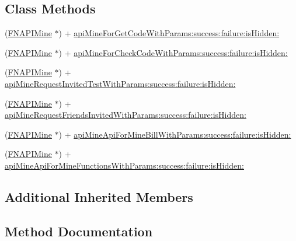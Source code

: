 \subsection*{Class Methods}
\begin{DoxyCompactItemize}
\item 
(\mbox{\hyperlink{interface_f_n_a_p_i_mine}{F\+N\+A\+P\+I\+Mine}} $\ast$) + \mbox{\hyperlink{interface_f_n_a_p_i_mine_a50062a925d7aa11ca5bb236073ecb43d}{api\+Mine\+For\+Get\+Code\+With\+Params\+:success\+:failure\+:is\+Hidden\+:}}
\item 
(\mbox{\hyperlink{interface_f_n_a_p_i_mine}{F\+N\+A\+P\+I\+Mine}} $\ast$) + \mbox{\hyperlink{interface_f_n_a_p_i_mine_ab0f166f0a2c655890d71830f4ab7c825}{api\+Mine\+For\+Check\+Code\+With\+Params\+:success\+:failure\+:is\+Hidden\+:}}
\item 
(\mbox{\hyperlink{interface_f_n_a_p_i_mine}{F\+N\+A\+P\+I\+Mine}} $\ast$) + \mbox{\hyperlink{interface_f_n_a_p_i_mine_a4d4e9cfee5260312ab78d8a65a554c58}{api\+Mine\+Request\+Invited\+Test\+With\+Params\+:success\+:failure\+:is\+Hidden\+:}}
\item 
(\mbox{\hyperlink{interface_f_n_a_p_i_mine}{F\+N\+A\+P\+I\+Mine}} $\ast$) + \mbox{\hyperlink{interface_f_n_a_p_i_mine_a4dd05da3324d96a0df4e13924c51c815}{api\+Mine\+Request\+Friends\+Invited\+With\+Params\+:success\+:failure\+:is\+Hidden\+:}}
\item 
(\mbox{\hyperlink{interface_f_n_a_p_i_mine}{F\+N\+A\+P\+I\+Mine}} $\ast$) + \mbox{\hyperlink{interface_f_n_a_p_i_mine_a715bccc118e679becfef5d020734cbe7}{api\+Mine\+Api\+For\+Mine\+Bill\+With\+Params\+:success\+:failure\+:is\+Hidden\+:}}
\item 
(\mbox{\hyperlink{interface_f_n_a_p_i_mine}{F\+N\+A\+P\+I\+Mine}} $\ast$) + \mbox{\hyperlink{interface_f_n_a_p_i_mine_ad8d6e099b04d7251e8f880695d002b50}{api\+Mine\+Api\+For\+Mine\+Functions\+With\+Params\+:success\+:failure\+:is\+Hidden\+:}}
\end{DoxyCompactItemize}
\subsection*{Additional Inherited Members}


\subsection{Method Documentation}
\mbox{\label{interface_f_n_a_p_i_mine_a715bccc118e679becfef5d020734cbe7}} 
